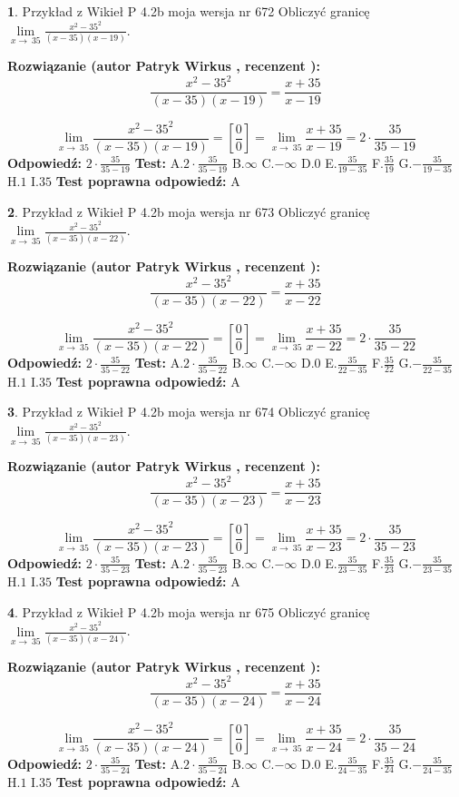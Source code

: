 \documentclass[12pt, a4paper]{article}
\theoremstyle{definition} %
\newtheorem{zad}{}
\newcommand{\zadStart}[1]{\begin{zad}#1\newline}
\newcommand{\zadStop}{\end{zad}}
\newcommand{\rozwStart}[2]{\noindent \textbf{Rozwiązanie (autor #1 , recenzent #2): }\newline}
\newcommand{\rozwStop}{\newline}
\newcommand{\odpStart}{\noindent \textbf{Odpowiedź:}\newline}
\newcommand{\odpStop}{\newline}
\newcommand{\testStart}{\noindent \textbf{Test:}\newline}
\newcommand{\testStop}{\newline}
\newcommand{\kluczStart}{\noindent \textbf{Test poprawna odpowiedź:}\newline}
\newcommand{\kluczStop}{\newline}
\begin{document}
\zadStart{Przykład z Wikieł P 4.2b moja wersja nr 672}
Obliczyć granicę $\lim\limits_{x\to\ 35}\frac{x^{2}-35^{2}}{(x-35)(x-19)}$.
\zadStop
\rozwStart{Patryk Wirkus}{}
$$\frac{x^{2}-35^{2}}{(x-35)(x-19)}=\frac{x+35}{x-19}$$

$$\lim\limits_{x\to\ 35}\frac{x^{2}-35^{2}}{(x-35)(x-19)}=[\frac{0}{0}]=\lim\limits_{x\to\ 35}\frac{x+35}{x-19}=2 \cdot \frac{35}{35-19}$$
\rozwStop
\odpStart
$2 \cdot \frac{35}{35-19}$
\odpStop
\testStart
A.$2 \cdot \frac{35}{35-19}$
B.$\infty$
C.$-\infty$
D.$0$
E.$\frac{35}{19-35}$
F.$\frac{35}{19}$
G.$-\frac{35}{19-35}$
H.$1$
I.$35$
\testStop
\kluczStart
A
\kluczStop



\zadStart{Przykład z Wikieł P 4.2b moja wersja nr 673}
Obliczyć granicę $\lim\limits_{x\to\ 35}\frac{x^{2}-35^{2}}{(x-35)(x-22)}$.
\zadStop
\rozwStart{Patryk Wirkus}{}
$$\frac{x^{2}-35^{2}}{(x-35)(x-22)}=\frac{x+35}{x-22}$$

$$\lim\limits_{x\to\ 35}\frac{x^{2}-35^{2}}{(x-35)(x-22)}=[\frac{0}{0}]=\lim\limits_{x\to\ 35}\frac{x+35}{x-22}=2 \cdot \frac{35}{35-22}$$
\rozwStop
\odpStart
$2 \cdot \frac{35}{35-22}$
\odpStop
\testStart
A.$2 \cdot \frac{35}{35-22}$
B.$\infty$
C.$-\infty$
D.$0$
E.$\frac{35}{22-35}$
F.$\frac{35}{22}$
G.$-\frac{35}{22-35}$
H.$1$
I.$35$
\testStop
\kluczStart
A
\kluczStop



\zadStart{Przykład z Wikieł P 4.2b moja wersja nr 674}
Obliczyć granicę $\lim\limits_{x\to\ 35}\frac{x^{2}-35^{2}}{(x-35)(x-23)}$.
\zadStop
\rozwStart{Patryk Wirkus}{}
$$\frac{x^{2}-35^{2}}{(x-35)(x-23)}=\frac{x+35}{x-23}$$

$$\lim\limits_{x\to\ 35}\frac{x^{2}-35^{2}}{(x-35)(x-23)}=[\frac{0}{0}]=\lim\limits_{x\to\ 35}\frac{x+35}{x-23}=2 \cdot \frac{35}{35-23}$$
\rozwStop
\odpStart
$2 \cdot \frac{35}{35-23}$
\odpStop
\testStart
A.$2 \cdot \frac{35}{35-23}$
B.$\infty$
C.$-\infty$
D.$0$
E.$\frac{35}{23-35}$
F.$\frac{35}{23}$
G.$-\frac{35}{23-35}$
H.$1$
I.$35$
\testStop
\kluczStart
A
\kluczStop



\zadStart{Przykład z Wikieł P 4.2b moja wersja nr 675}
Obliczyć granicę $\lim\limits_{x\to\ 35}\frac{x^{2}-35^{2}}{(x-35)(x-24)}$.
\zadStop
\rozwStart{Patryk Wirkus}{}
$$\frac{x^{2}-35^{2}}{(x-35)(x-24)}=\frac{x+35}{x-24}$$

$$\lim\limits_{x\to\ 35}\frac{x^{2}-35^{2}}{(x-35)(x-24)}=[\frac{0}{0}]=\lim\limits_{x\to\ 35}\frac{x+35}{x-24}=2 \cdot \frac{35}{35-24}$$
\rozwStop
\odpStart
$2 \cdot \frac{35}{35-24}$
\odpStop
\testStart
A.$2 \cdot \frac{35}{35-24}$
B.$\infty$
C.$-\infty$
D.$0$
E.$\frac{35}{24-35}$
F.$\frac{35}{24}$
G.$-\frac{35}{24-35}$
H.$1$
I.$35$
\testStop
\kluczStart
A
\kluczStop
\end{document}
